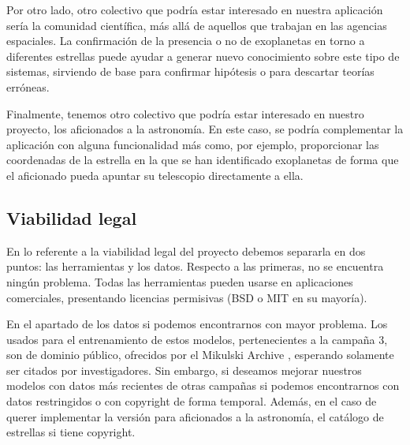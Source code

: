 Por otro lado, otro colectivo que podría estar interesado en nuestra aplicación sería la comunidad científica, más allá de aquellos que trabajan en las agencias espaciales. La confirmación de la presencia o no de exoplanetas en torno a diferentes estrellas puede ayudar a generar nuevo conocimiento sobre este tipo de sistemas, sirviendo de base para confirmar hipótesis o para descartar teorías erróneas. 

Finalmente, tenemos otro colectivo que podría estar interesado en nuestro proyecto, los aficionados a la astronomía. En este caso, se podría complementar la aplicación con alguna funcionalidad más como, por ejemplo, proporcionar las coordenadas de la estrella en la que se han identificado exoplanetas de forma que el aficionado pueda apuntar su telescopio directamente a ella.


\subsection{Viabilidad legal}

En lo referente a la viabilidad legal del proyecto debemos separarla en dos puntos: las herramientas y los datos. Respecto a las primeras, no se encuentra ningún problema. Todas las herramientas pueden usarse en aplicaciones comerciales, presentando licencias permisivas (BSD o MIT en su mayoría).

En el apartado de los datos si podemos encontrarnos con mayor problema. Los usados para el entrenamiento de estos modelos, pertenecientes a la campaña 3, son de dominio público, ofrecidos por el Mikulski Archive \cite{Mikulski-Archive}, esperando solamente ser citados por investigadores. Sin embargo, si deseamos mejorar nuestros modelos con datos más recientes de otras campañas si podemos encontrarnos con datos restringidos o con copyright de forma temporal. Además, en el caso de querer implementar la versión para aficionados a la astronomía, el catálogo de estrellas si tiene copyright.